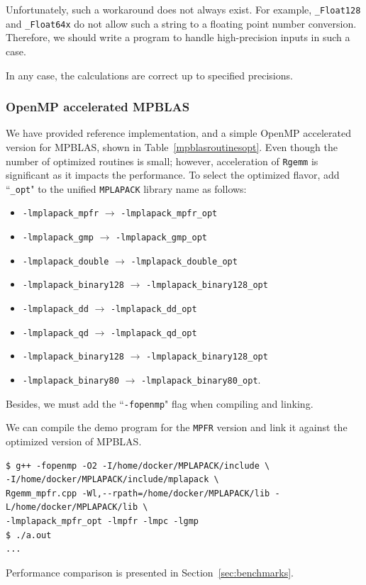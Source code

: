 \documentclass[12pt]{article}
\begin{document}
Unfortunately, such a workaround does not always exist. For example, {\tt \_Float128} and {\tt \_Float64x} do not allow such a string to a floating point number conversion. Therefore, we should write a program to handle high-precision inputs in such a case.

In any case, the calculations are correct up to specified precisions.

\subsubsection{OpenMP accelerated MPBLAS}
We have provided reference implementation, and a simple OpenMP accelerated version for MPBLAS, shown in Table~\ref{mpblasroutinesopt}. Even though the number of optimized routines is small; however, acceleration of {\tt Rgemm} is significant as it impacts the performance.
To select the optimized flavor, add ``{\tt \_opt}" to the unified {\tt MPLAPACK} library name as follows:
\begin{itemize}
    \item {\tt -lmplapack\_mpfr} $\rightarrow$ {\tt -lmplapack\_mpfr\_opt}
    \item {\tt -lmplapack\_gmp} $\rightarrow$ {\tt -lmplapack\_gmp\_opt}
    \item {\tt -lmplapack\_double} $\rightarrow$ {\tt -lmplapack\_double\_opt}
    \item {\tt -lmplapack\_binary128} $\rightarrow$ {\tt -lmplapack\_binary128\_opt}
    \item {\tt -lmplapack\_dd} $\rightarrow$ {\tt -lmplapack\_dd\_opt}
    \item {\tt -lmplapack\_qd} $\rightarrow$ {\tt -lmplapack\_qd\_opt}
    \item {\tt -lmplapack\_binary128} $\rightarrow$ {\tt -lmplapack\_binary128\_opt}
    \item {\tt -lmplapack\_binary80} $\rightarrow$ {\tt -lmplapack\_binary80\_opt}.
\end{itemize}
Besides, we must add the ``{\tt -fopenmp}" flag when compiling and linking.

We can compile the demo program for the {\tt MPFR} version and link it against the optimized version of MPBLAS.
\begin{verbatim}
$ g++ -fopenmp -O2 -I/home/docker/MPLAPACK/include \
-I/home/docker/MPLAPACK/include/mplapack \
Rgemm_mpfr.cpp -Wl,--rpath=/home/docker/MPLAPACK/lib -L/home/docker/MPLAPACK/lib \
-lmplapack_mpfr_opt -lmpfr -lmpc -lgmp
$ ./a.out
...
\end{verbatim}
Performance comparison is presented in Section~\ref{sec:benchmarks}.
\end{document}
